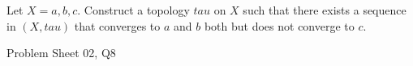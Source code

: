 \begin{samepage}
\begin{ex}
Let $X = {{ a, b, c }}$. Construct a topology $tau$ on $X$ such that there exists a sequence in $(X, tau)$ that converges to $a$ and $b$ both but does not converge to $c$.
\end{ex}
\begin{source}
Problem Sheet 02, Q8
\end{source}
\end{samepage}
